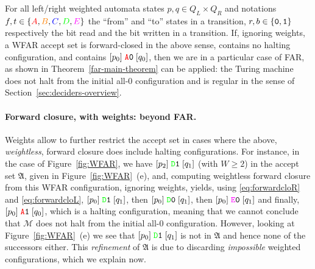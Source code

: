 For all left/right weighted automata states $p,q \in Q_L \times Q_R$ and notations $f,t \in \{\stateA,\stateB,\stateC,\stateD,\stateE\}$ the ``from'' and ``to'' states in a transition, $r,b \in \left\{\texttt{0},\texttt{1}\right\}$ respectively the bit read and the bit written in a transition. If, ignoring weights, a WFAR accept set is forward-closed in the above sense, contains no halting configuration, and contains $[p_0] \; \texttt{\stateA}\szero\; [q_0]$, then we are in a particular case of FAR, as shown in \cite{bbchallenge_part1} \ie Theorem~\ref{far-main-theorem} can be applied: the Turing machine does not halt from the initial all-0 configuration and is regular in the sense of Section~\ref{sec:deciders-overview}.

\paragraph{Forward closure, with weights: beyond FAR.} Weights allow to further restrict the accept set in cases where the above, \textit{weightless}, forward closure does include halting configurations. For instance, in the case of Figure~\ref{fig:WFAR}, we have $[p_2] \; \texttt{\stateD}\sone \; [q_1]$ (with $W \geq 2$) in the accept set $\mathfrak{A}$, given in Figure~\ref{fig:WFAR}~(e), and, computing weightless forward closure from this WFAR configuration, ignoring weights, yields, using \eqref{eq:forwardcloR} and \eqref{eq:forwardcloL}, $[p_0] \; \texttt{\stateD}\sone \; [q_1]$, then $[p_0] \; \texttt{\stateD}\szero \; [q_1]$, then $[p_0] \; \texttt{\stateE}\szero \; [q_1]$ and finally, $[p_0] \; \texttt{\stateA}\sone \; [q_0] $, which is a halting configuration, meaning that we cannot conclude that $\mathcal{M}$ does not halt from the initial all-0 configuration. However, looking at Figure~\ref{fig:WFAR}~(e) we see that $[p_0] \; \texttt{\stateD}\sone \; [q_1]$ is not in $\mathfrak{A}$ and hence none of the successors either. This \textit{refinement} of $\mathfrak{A}$ is due to discarding \textit{impossible} weighted configurations, which we explain now.

